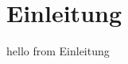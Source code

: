 \documentclass[.../Dokumentation.tex]{subfiles}
\begin{document}
    \section{Einleitung}\label{sec-intr}
    hello from Einleitung
\end{document}

